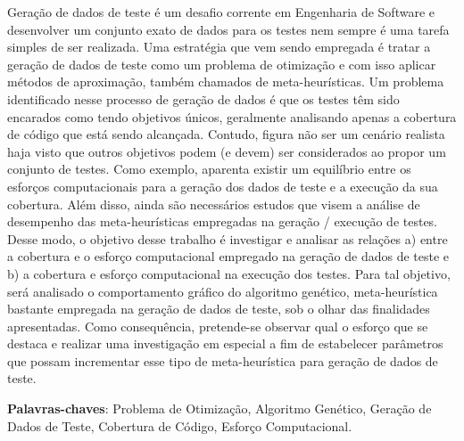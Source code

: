 \begin{resumo}
 
Geração de dados de teste é um desafio corrente em Engenharia de Software e
desenvolver um conjunto exato de dados para os testes nem sempre é uma tarefa
simples de ser realizada.  Uma estratégia que vem sendo empregada é tratar a
geração de dados de teste como um problema de otimização e com isso aplicar
métodos de aproximação, também chamados de meta-heurísticas. Um problema
identificado nesse processo de geração de dados é que os testes têm sido
encarados como tendo objetivos únicos, geralmente analisando apenas a cobertura
de código que está sendo alcançada. Contudo, figura não ser um cenário
realista haja visto que outros objetivos podem (e devem) ser considerados ao
propor um conjunto de testes. Como exemplo, aparenta existir um equilíbrio entre os
esforços computacionais para a geração dos dados de teste e a execução da sua
cobertura.  Além disso, ainda são necessários estudos que visem a análise de
desempenho das meta-heurísticas empregadas na geração / execução de testes.
Desse modo, o objetivo desse trabalho é investigar e analisar as relações a)
entre a cobertura e o esforço computacional empregado na geração de dados de
teste e b) a cobertura e esforço computacional na execução dos testes. Para tal
objetivo, será analisado o comportamento gráfico do algoritmo genético,
meta-heurística bastante empregada na geração de dados de teste, sob o olhar das
finalidades apresentadas. Como consequência, pretende-se observar qual o esforço
que se destaca e realizar uma investigação em especial a fim de estabelecer
parâmetros que possam incrementar esse tipo de meta-heurística para 
geração de dados de teste.

 \vspace{\onelineskip}
    
 \noindent
 \textbf{Palavras-chaves}: Problema de Otimização, Algoritmo Genético, Geração de Dados de Teste, Cobertura de Código, Esforço Computacional.
\end{resumo}
